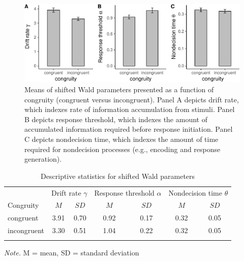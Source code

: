 \documentclass[english,,man]{apa6}
\theoremstyle{definition}
\theoremstyle{definition}
\theoremstyle{definition}
\theoremstyle{remark}
\begin{document}
\begin{figure}
\centering
\includegraphics{paper_files/figure-latex/waldModel-1.pdf}
\caption{\label{fig:waldModel}Means of shifted Wald parameters presented as
a function of congruity (congruent versus incongruent). Panel A depicts
drift rate, which indexes rate of information accumulation from stimuli.
Panel B depicts response threshold, which indexes the amount of
accumulated information required before response initiation. Panel C
depicts nondecision time, which indexes the amount of time required for
nondecision processes (e.g., encoding and response generation).}
\end{figure}

\begin{table}[tbp]
\begin{center}
\begin{threeparttable}
\caption{\label{tab:resultsTable}Descriptive statistics for shifted Wald parameters}
\begin{tabular}{lcccccc}
\toprule
 & \multicolumn{2}{c}{Drift rate $\gamma$} & \multicolumn{2}{c}{Response threshold $\alpha$} & \multicolumn{2}{c}{Nondecision time $\theta$} \\
\cmidrule(r){2-3} \cmidrule(r){4-5} \cmidrule(r){6-7}
Congruity & $M$ & $SD$ & $M$ & $SD$ & $M$ & $SD$\\
\midrule
congruent & 3.91 & 0.70 & 0.92 & 0.17 & 0.32 & 0.05\\
incongruent & 3.30 & 0.51 & 1.04 & 0.22 & 0.32 & 0.05\\
\bottomrule
\addlinespace
\end{tabular}
\begin{tablenotes}[para]
\normalsize{\textit{Note.} M = mean, SD = standard deviation}
\end{tablenotes}
\end{threeparttable}
\end{center}
\end{table}
\end{document}
